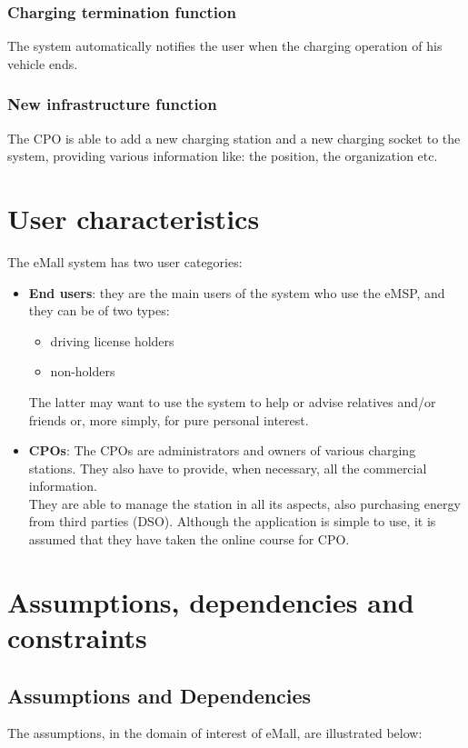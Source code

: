 \subsubsection{Charging termination function}
The system automatically notifies the user when the charging operation of his vehicle ends.
\subsubsection{New infrastructure function}
The CPO is able to add a new charging station and a new charging socket to the system, providing various information like: the position, the organization etc.
\section{User characteristics}
The eMall system has two user categories:
\begin{itemize}
    \item \textbf{End users}: they are the main users of the system who use the eMSP, and they can be of two types: 
    \begin{itemize}
        \item driving license holders
        \item non-holders
    \end{itemize}
    The latter may want to use the system to help or advise relatives and/or friends or, more simply, for pure personal interest.
    \item \textbf{CPOs}: The CPOs are administrators and owners of various charging stations. They also have to provide, when necessary, all the commercial information. \\
    They are able to manage the station in all its aspects, also purchasing energy from third parties (DSO). Although the application is simple to use, it is assumed that they have taken the online course for CPO.
\end{itemize}
\clearpage
\section{Assumptions, dependencies and constraints}
\subsection{Assumptions and Dependencies}
The assumptions, in the domain of interest of eMall, are illustrated below:

